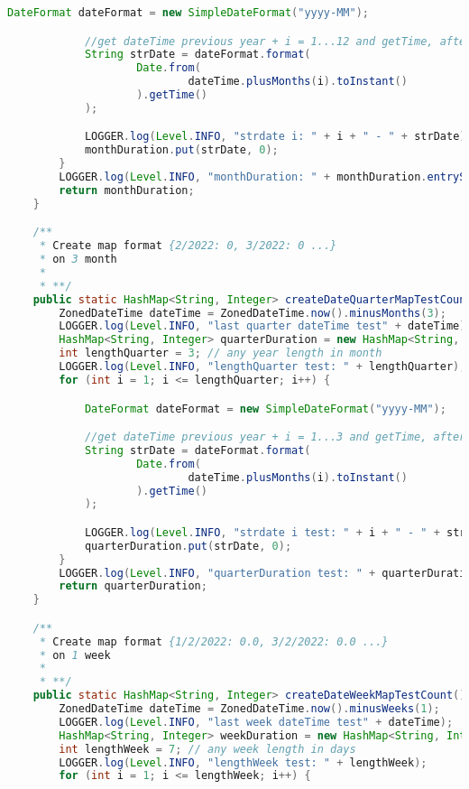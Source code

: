 \begin{lstlisting}[language=Java]
            DateFormat dateFormat = new SimpleDateFormat("yyyy-MM");

            //get dateTime previous year + i = 1...12 and getTime, after in strDate=2022-03
            String strDate = dateFormat.format(
                    Date.from(
                            dateTime.plusMonths(i).toInstant()
                    ).getTime()
            );

            LOGGER.log(Level.INFO, "strdate i: " + i + " - " + strDate);
            monthDuration.put(strDate, 0);
        }
        LOGGER.log(Level.INFO, "monthDuration: " + monthDuration.entrySet());
        return monthDuration;
    }

    /**
     * Create map format {2/2022: 0, 3/2022: 0 ...}
     * on 3 month
     *
     * **/
    public static HashMap<String, Integer> createDateQuarterMapTestCount() {
        ZonedDateTime dateTime = ZonedDateTime.now().minusMonths(3);
        LOGGER.log(Level.INFO, "last quarter dateTime test" + dateTime);
        HashMap<String, Integer> quarterDuration = new HashMap<String, Integer>();
        int lengthQuarter = 3; // any year length in month
        LOGGER.log(Level.INFO, "lengthQuarter test: " + lengthQuarter);
        for (int i = 1; i <= lengthQuarter; i++) {

            DateFormat dateFormat = new SimpleDateFormat("yyyy-MM");

            //get dateTime previous year + i = 1...3 and getTime, after in strDate=2022-03
            String strDate = dateFormat.format(
                    Date.from(
                            dateTime.plusMonths(i).toInstant()
                    ).getTime()
            );

            LOGGER.log(Level.INFO, "strdate i test: " + i + " - " + strDate);
            quarterDuration.put(strDate, 0);
        }
        LOGGER.log(Level.INFO, "quarterDuration test: " + quarterDuration.entrySet());
        return quarterDuration;
    }

    /**
     * Create map format {1/2/2022: 0.0, 3/2/2022: 0.0 ...}
     * on 1 week
     *
     * **/
    public static HashMap<String, Integer> createDateWeekMapTestCount() {
        ZonedDateTime dateTime = ZonedDateTime.now().minusWeeks(1);
        LOGGER.log(Level.INFO, "last week dateTime test" + dateTime);
        HashMap<String, Integer> weekDuration = new HashMap<String, Integer>();
        int lengthWeek = 7; // any week length in days
        LOGGER.log(Level.INFO, "lengthWeek test: " + lengthWeek);
        for (int i = 1; i <= lengthWeek; i++) {


\end{lstlisting}
